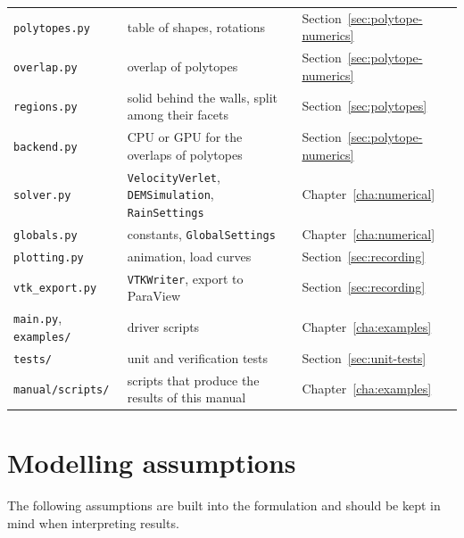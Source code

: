 \begin{table}[htbp]
\begin{tabular}{l>{\raggedright\arraybackslash}p{4.9cm}>{\raggedright\arraybackslash}p{4.3cm}}
    \texttt{polytopes.py} &
      table of shapes, rotations &
      Section~\ref{sec:polytope-numerics} \\
    \texttt{overlap.py} &
      overlap of polytopes &
      Section~\ref{sec:polytope-numerics} \\
    \texttt{regions.py} &
      solid behind the walls, split among their facets &
      Section~\ref{sec:polytopes} \\
    \texttt{backend.py} &
      CPU or GPU for the overlaps of polytopes &
      Section~\ref{sec:polytope-numerics} \\
    \texttt{solver.py} &
      \texttt{VelocityVerlet}, \texttt{DEMSimulation}, \texttt{RainSettings} &
      Chapter~\ref{cha:numerical} \\
    \texttt{globals.py} &
      constants, \texttt{GlobalSettings} &
      Chapter~\ref{cha:numerical} \\
    \texttt{plotting.py} &
      animation, load curves &
      Section~\ref{sec:recording} \\
    \texttt{vtk\_export.py} &
      \texttt{VTKWriter}, export to ParaView &
      Section~\ref{sec:recording} \\
    \texttt{main.py}, \texttt{examples/} &
      driver scripts &
      Chapter~\ref{cha:examples} \\
    \texttt{tests/} &
      unit and verification tests &
      Section~\ref{sec:unit-tests} \\
    \texttt{manual/scripts/} &
      scripts that produce the results of this manual &
      Chapter~\ref{cha:examples} \\
    \bottomrule
  \end{tabular}
\end{table}

\section{Modelling assumptions}
\label{sec:assumptions}

The following assumptions are built into the formulation and should be kept in
mind when interpreting results.

